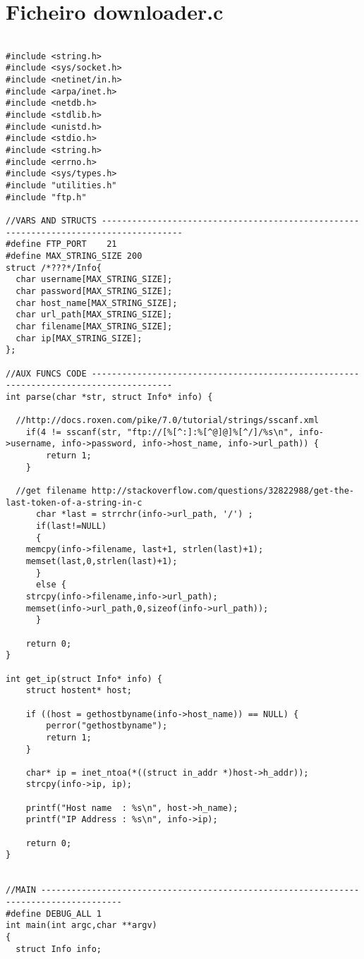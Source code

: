 \section{Ficheiro downloader.c}
\label{DOWNLOADERC}

\begin{lstlisting}

#include <string.h>
#include <sys/socket.h>
#include <netinet/in.h>
#include <arpa/inet.h>
#include <netdb.h>
#include <stdlib.h>
#include <unistd.h>
#include <stdio.h>
#include <string.h>
#include <errno.h> 
#include <sys/types.h>
#include "utilities.h"
#include "ftp.h"

//VARS AND STRUCTS --------------------------------------------------------------------------------------
#define FTP_PORT	21
#define MAX_STRING_SIZE 200
struct /*???*/Info{
  char username[MAX_STRING_SIZE];
  char password[MAX_STRING_SIZE];
  char host_name[MAX_STRING_SIZE];
  char url_path[MAX_STRING_SIZE];
  char filename[MAX_STRING_SIZE];
  char ip[MAX_STRING_SIZE];
};

//AUX FUNCS CODE --------------------------------------------------------------------------------------
int parse(char *str, struct Info* info) {
  
  //http://docs.roxen.com/pike/7.0/tutorial/strings/sscanf.xml
	if(4 != sscanf(str, "ftp://[%[^:]:%[^@]@]%[^/]/%s\n", info->username, info->password, info->host_name, info->url_path)) {
		return 1;
	}

  //get filename http://stackoverflow.com/questions/32822988/get-the-last-token-of-a-string-in-c
      char *last = strrchr(info->url_path, '/') ;
      if(last!=NULL) 
      {
	memcpy(info->filename, last+1, strlen(last)+1);
	memset(last,0,strlen(last)+1);
      }
      else {
	strcpy(info->filename,info->url_path);
	memset(info->url_path,0,sizeof(info->url_path));
      }
  
	return 0;
}

int get_ip(struct Info* info) {
	struct hostent* host;

	if ((host = gethostbyname(info->host_name)) == NULL) {
		perror("gethostbyname");
		return 1;
	}

	char* ip = inet_ntoa(*((struct in_addr *)host->h_addr));
	strcpy(info->ip, ip);

	printf("Host name  : %s\n", host->h_name);
	printf("IP Address : %s\n", info->ip);
	
	return 0;
}


//MAIN --------------------------------------------------------------------------------------
#define DEBUG_ALL 1
int main(int argc,char **argv)
{
  struct Info info;
  

\end{lstlisting}
